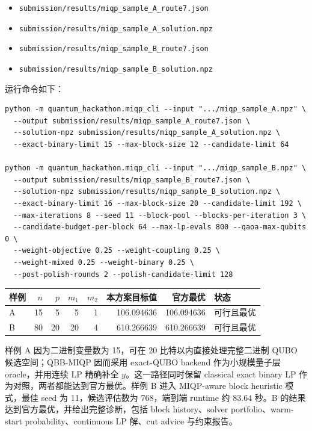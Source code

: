 \documentclass[UTF8,a4paper,11pt]{ctexart}
\begin{document}
\begin{itemize}
  \item \texttt{submission/results/miqp\_sample\_A\_route7.json}
  \item \texttt{submission/results/miqp\_sample\_A\_solution.npz}
  \item \texttt{submission/results/miqp\_sample\_B\_route7.json}
  \item \texttt{submission/results/miqp\_sample\_B\_solution.npz}
\end{itemize}

运行命令如下：

\begin{verbatim}
python -m quantum_hackathon.miqp_cli --input ".../miqp_sample_A.npz" \
  --output submission/results/miqp_sample_A_route7.json \
  --solution-npz submission/results/miqp_sample_A_solution.npz \
  --exact-binary-limit 15 --max-block-size 12 --candidate-limit 64

python -m quantum_hackathon.miqp_cli --input ".../miqp_sample_B.npz" \
  --output submission/results/miqp_sample_B_route7.json \
  --solution-npz submission/results/miqp_sample_B_solution.npz \
  --exact-binary-limit 16 --max-block-size 20 --candidate-limit 192 \
  --max-iterations 8 --seed 11 --block-pool --blocks-per-iteration 3 \
  --candidate-budget-per-block 64 --max-lp-evals 800 --qaoa-max-qubits 0 \
  --weight-objective 0.25 --weight-coupling 0.25 \
  --weight-mixed 0.25 --weight-binary 0.25 \
  --post-polish-rounds 2 --polish-candidate-limit 128
\end{verbatim}

\begin{center}
\begin{tabular}{lrrrrrrl}
\toprule
样例 & $n$ & $p$ & $m_1$ & $m_2$ & 本方案目标值 & 官方最优 & 状态 \\
\midrule
A & 15 & 5 & 5 & 1 & 106.094636 & 106.094636 & 可行且最优 \\
B & 80 & 20 & 20 & 4 & 610.266639 & 610.266639 & 可行且最优 \\
\bottomrule
\end{tabular}
\end{center}

样例 A 因为二进制变量数为 15，可在 20 比特以内直接处理完整二进制 QUBO 候选空间；QBB-MIQP 因而采用 exact-QUBO backend 作为小规模量子层 oracle，并用连续 LP 精确补全 $y$。这一路径同时保留 classical exact binary LP 作为对照，两者都能达到官方最优。样例 B 进入 MIQP-aware block heuristic 模式，最佳 seed 为 11，候选评估数为 768，端到端 runtime 约 $83.64$ 秒。B 的结果达到官方最优，并给出完整诊断，包括 block history、solver portfolio、warm-start probability、continuous LP 解、cut advice 与约束报告。
\end{document}

